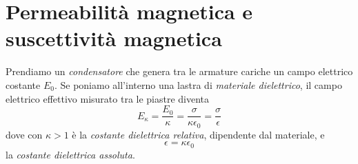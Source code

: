 \section{Permeabilità magnetica e suscettività magnetica}

\begin{remember}
Prendiamo un \textit{condensatore} che genera tra le armature cariche un campo elettrico costante $E_0$. Se poniamo all'interno una lastra di \textit{materiale dielettrico}, il campo elettrico effettivo misurato tra le piastre diventa
\begin{equation*}
	E_\kappa=\frac{E_0}{\kappa}=\frac{\sigma}{\kappa\epsilon_0}=\frac{\sigma}{\epsilon}
\end{equation*}
dove con $\kappa>1$ è la \textit{costante dielettrica relativa}, dipendente dal materiale, e
\begin{equation*}
	\epsilon=\kappa \epsilon_0
\end{equation*}
la \textit{costante dielettrica assoluta}.
\end{remember}
